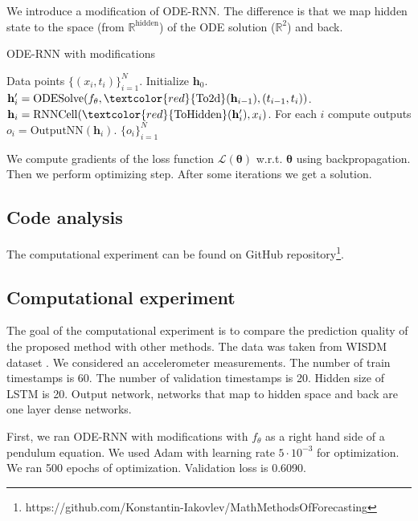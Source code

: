 \documentclass[../../main.tex]{subfiles}
\begin{document}
We introduce a modification of ODE-RNN. The difference is that we map hidden state to the space (from $\mathbb{R}^\text{hidden}$) of the ODE solution ($\mathbb{R}^2$) and back.
\begin{algorithm}[H]
\begin{algorithmic}
\caption{ODE-RNN with modifications}
\REQUIRE Data points $\{(x_i, t_i)\}_{i=1}^N$.
\STATE Initialize $\mathbf{h}_0$.
\STATE $\mathbf{h}_i' = \mathrm{ODESolve}(f_\theta, \textcolor{red}{\mathrm{To2d}}(\mathbf{h}_{i-1}), (t_{i-1}, t_i))$.
\STATE $\mathbf{h}_i = \mathrm{RNNCell}(\textcolor{red}{\mathrm{ToHidden}}(\mathbf{h}_i'), x_i)$.
\ENDFOR
\STATE For each $i$ compute outputs $o_i = \mathrm{OutputNN}(\mathbf{h}_i)$.
\RETURN $\{o_i\}_{i=1}^N$
\end{algorithmic}
\end{algorithm}

We compute gradients of the loss function $\mathcal{L}(\boldsymbol{\theta})$ w.r.t. $\boldsymbol\theta$ using backpropagation. Then we perform optimizing step. After some iterations we get a solution. 

\subsection{Code analysis}

The computational experiment can be found on GitHub repository\footnote{https://github.com/Konstantin-Iakovlev/MathMethodsOfForecasting}.

\subsection{Computational experiment}

The goal of the computational experiment is to compare the prediction quality of the proposed method with other methods. The data was taken from WISDM dataset \cite{kwapisz2011activity}. We considered an accelerometer measurements. The number of train timestamps is 60. The number of validation timestamps is 20. Hidden size of LSTM is 20. Output network, networks that map to hidden space and back are one layer dense networks.

First, we ran ODE-RNN with modifications with $f_\theta$ as a right hand side of a pendulum equation. We used Adam with learning rate $5\cdot 10^{-3}$ for optimization. We ran 500 epochs of optimization. Validation loss is 0.6090.
\end{document}
